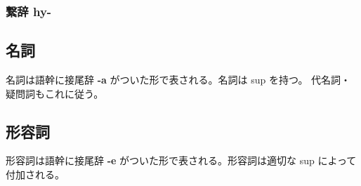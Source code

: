 \subsubsection{繋辞 hy-}

\subsection{名詞}

名詞は語幹に接尾辞 \textbf{-a} がついた形で表される。名詞は sup を持つ。
代名詞・疑問詞もこれに従う。

\subsection{形容詞}

形容詞は語幹に接尾辞 \textbf{-e} がついた形で表される。形容詞は適切な sup によって付加される。